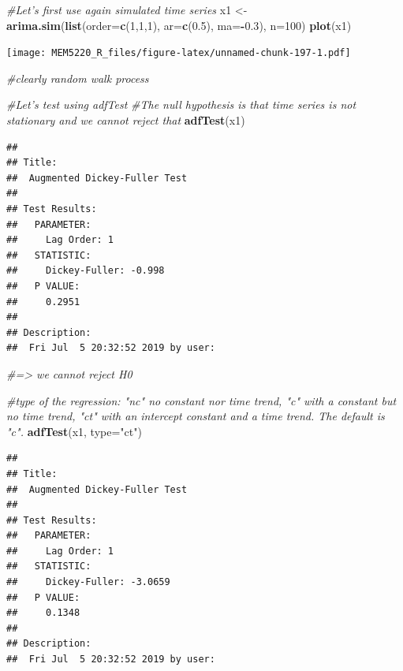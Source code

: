 \documentclass[]{book}
\newenvironment{Shaded}{\begin{snugshade}}{\end{snugshade}}
\newcommand{\CommentTok}[1]{\textcolor[rgb]{0.56,0.35,0.01}{\textit{#1}}}
\newcommand{\DataTypeTok}[1]{\textcolor[rgb]{0.13,0.29,0.53}{#1}}
\newcommand{\DecValTok}[1]{\textcolor[rgb]{0.00,0.00,0.81}{#1}}
\newcommand{\FloatTok}[1]{\textcolor[rgb]{0.00,0.00,0.81}{#1}}
\newcommand{\KeywordTok}[1]{\textcolor[rgb]{0.13,0.29,0.53}{\textbf{#1}}}
\newcommand{\NormalTok}[1]{#1}
\newcommand{\OperatorTok}[1]{\textcolor[rgb]{0.81,0.36,0.00}{\textbf{#1}}}
\newcommand{\StringTok}[1]{\textcolor[rgb]{0.31,0.60,0.02}{#1}}
\begin{document}
\begin{Shaded}
\begin{Highlighting}[]
\CommentTok{#Let's first use again simulated time series}
\NormalTok{x1 <-}\StringTok{ }\KeywordTok{arima.sim}\NormalTok{(}\KeywordTok{list}\NormalTok{(}\DataTypeTok{order=}\KeywordTok{c}\NormalTok{(}\DecValTok{1}\NormalTok{,}\DecValTok{1}\NormalTok{,}\DecValTok{1}\NormalTok{), }\DataTypeTok{ar=}\KeywordTok{c}\NormalTok{(}\FloatTok{0.5}\NormalTok{), }\DataTypeTok{ma=}\OperatorTok{-}\FloatTok{0.3}\NormalTok{), }\DataTypeTok{n=}\DecValTok{100}\NormalTok{)}
\KeywordTok{plot}\NormalTok{(x1)}
\end{Highlighting}
\end{Shaded}

\texttt{[image: MEM5220\_R\_files/figure-latex/unnamed-chunk-197-1.pdf]}

\begin{Shaded}
\begin{Highlighting}[]
\CommentTok{#clearly random walk process}

\CommentTok{#Let's test using adfTest}
\CommentTok{#The null hypothesis is that time series is not stationary and we cannot reject that}
\KeywordTok{adfTest}\NormalTok{(x1)}
\end{Highlighting}
\end{Shaded}

\begin{verbatim}
## 
## Title:
##  Augmented Dickey-Fuller Test
## 
## Test Results:
##   PARAMETER:
##     Lag Order: 1
##   STATISTIC:
##     Dickey-Fuller: -0.998
##   P VALUE:
##     0.2951 
## 
## Description:
##  Fri Jul  5 20:32:52 2019 by user:
\end{verbatim}

\begin{Shaded}
\begin{Highlighting}[]
\CommentTok{#=> we cannot reject H0}

\CommentTok{#type of the regression:  "nc" no constant nor time trend, "c" with a constant but no time trend, "ct" with an intercept constant and a time trend. The default is "c".}
\KeywordTok{adfTest}\NormalTok{(x1, }\DataTypeTok{type=}\StringTok{"ct"}\NormalTok{)}
\end{Highlighting}
\end{Shaded}

\begin{verbatim}
## 
## Title:
##  Augmented Dickey-Fuller Test
## 
## Test Results:
##   PARAMETER:
##     Lag Order: 1
##   STATISTIC:
##     Dickey-Fuller: -3.0659
##   P VALUE:
##     0.1348 
## 
## Description:
##  Fri Jul  5 20:32:52 2019 by user:
\end{verbatim}
\end{document}
